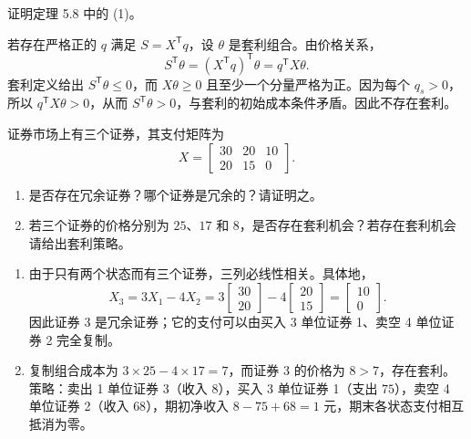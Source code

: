 \begin{problem}
 证明定理 5.8 中的 (1)。
\end{problem}
\begin{solution}
若存在严格正的 $q$ 满足 $S=X^{\mathsf T}q$，设 $\theta$ 是套利组合。由价格关系，
\[
S^{\mathsf T}\theta=(X^{\mathsf T}q)^{\mathsf T}\theta=q^{\mathsf T}X\theta.
\]
套利定义给出 $S^{\mathsf T}\theta\le0$，而 $X\theta\ge0$ 且至少一个分量严格为正。因为每个 $q_s>0$，所以 $q^{\mathsf T}X\theta>0$，从而 $S^{\mathsf T}\theta>0$，与套利的初始成本条件矛盾。因此不存在套利。
\end{solution}
\begin{problem}
 证券市场上有三个证券，其支付矩阵为
\[
    X=\begin{bmatrix}
        30 & 20 & 10\\
        20 & 15 & 0
    \end{bmatrix}.
\]
\begin{enumerate}[label=(\alph*)]
    \item 是否存在冗余证券？哪个证券是冗余的？请证明之。
    \item 若三个证券的价格分别为 $25$、$17$ 和 $8$，是否存在套利机会？若存在套利机会请给出套利策略。
\end{enumerate}
\end{problem}
\begin{solution}
\begin{enumerate}[label=(\alph*)]
\item 由于只有两个状态而有三个证券，三列必线性相关。具体地，
\[
X_3=3X_1-4X_2
=3\begin{bmatrix}30\\20\end{bmatrix}
-4\begin{bmatrix}20\\15\end{bmatrix}
=\begin{bmatrix}10\\0\end{bmatrix}.
\]
因此证券 3 是冗余证券；它的支付可以由买入 3 单位证券 1、卖空 4 单位证券 2 完全复制。
\item 复制组合成本为 $3\times25-4\times17=7$，而证券 3 的价格为 $8>7$，存在套利。策略：卖出 1 单位证券 3（收入 $8$），买入 3 单位证券 1（支出 $75$），卖空 4 单位证券 2（收入 $68$），期初净收入 $8-75+68=1$ 元，期末各状态支付相互抵消为零。
\end{enumerate}
\end{solution}

